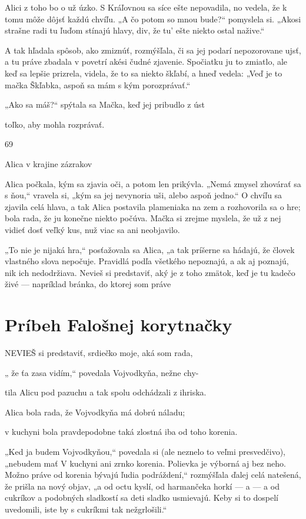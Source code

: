 \documentclass[12pt]{book}
\begin{document}
\begin{Parallel}[p]{}{}
{Alici z toho bo o už úzko. S Kráľovnou sa síce ešte
nepovadila, no vedela, že k tomu môže dôjsť každú chvíľu.
„A čo potom so mnou bude?“ pomyslela si. „Akosi strašne
radi tu ľuďom stínajú hlavy, div, že tu' ešte niekto ostal
nažive.“

A tak hľadala spôsob, ako zmiznúť, rozmýšľala, či sa jej
podarí nepozorovane ujsť, a tu práve zbadala v povetrí akési
čudné zjavenie. Spočiatku ju to zmiatlo, ale keď sa lepšie
prizrela, videla, že to sa niekto škľabí, a hneď vedela: „Veď
je to mačka Škľabka, aspoň sa mám s kým porozprávať.“

„Ako sa máš?“ spýtala sa Mačka, keď jej pribudlo z úst

toľko, aby mohla rozprávať.

69

Alica v krajine zázrakov

Alica počkala, kým sa zjavia oči, a potom len prikývla.
„Nemá zmysel zhovárať sa s ňou,“ vravela si, „kým sa jej
nevynoria uši, alebo aspoň jedno.“ O chvíľu sa zjavila celá
hlava, a tak Alica postavila plameniaka na zem a rozhovorila
sa o hre; bola rada, že ju konečne niekto počúva. Mačka si
zrejme myslela, že už z nej vidieť dosť veľký kus, nuž viac sa
ani neobjavilo.

„To nie je nijaká hra,“ posťažovala sa Alica, „a tak
príšerne sa hádajú, že človek vlastného slova nepočuje.
Pravidlá podľa všetkého nepoznajú, a ak aj poznajú, nik ich
nedodržiava. Nevieš si predstaviť, aký je z toho zmätok, keď
je tu kadečo živé — napríklad bránka, do ktorej som práve

\section{Príbeh Falošnej korytnačky}

NEVIEŠ si predstaviť, srdiečko moje, aká som rada,

„ že ťa zasa vidím,“ povedala Vojvodkyňa, nežne chy-

tila Alicu pod pazuchu a tak spolu odchádzali z ihriska.

Alica bola rada, že Vojvodkyňa má dobrú náladu;

v kuchyni bola pravdepodobne taká zlostná iba od toho
korenia.

„Ked ja budem Vojvodkyňou,“ povedala si (ale neznelo
to veľmi presvedčivo), „nebudem mať V kuchyni ani zrnko
korenia. Polievka je výborná aj bez neho. Možno práve od
korenia bývajú ľudia podráždení,“ rozmýšľala ďalej celá
natešená, že prišla na nový objav, „a od octu kyslí, od
harmančeka horkí — a — a od cukríkov a podobných
sladkostí sa deti sladko usmievajú. Keby si to dospelí
uvedomili, iste by s cukríkmi tak nežgrlošili.“

}
\end{Parallel}
\end{document}
